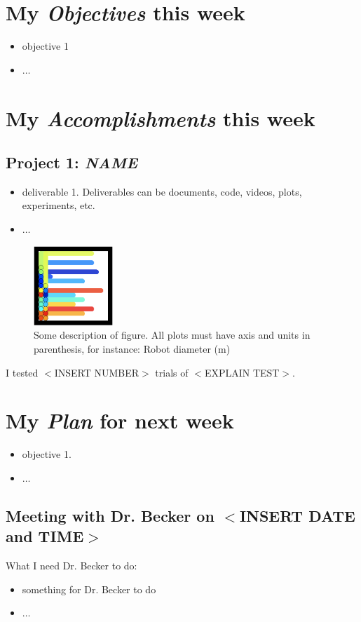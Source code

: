 \newcommand{\handoutName}{Weekly report}
\newcommand{\handoutdate}{\today}
\newcommand{\duedate}{}


\section{My \emph{Objectives} this week}
\begin{itemize}
\item objective 1
\item $\ldots$
\end{itemize}


\section{My \emph{Accomplishments} this week}

\subsection{Project 1: \emph{NAME}}

\begin{itemize}
\item deliverable 1.  Deliverables can be documents, code, videos, plots, experiments, etc.
\item $\ldots$
\end{itemize}

\begin{figure}[h]
\begin{center}
\includegraphics[width=3cm]{fig/CovergeSimpleEnd.png}
\caption{Some description of figure.  All plots must have axis and units in parenthesis, for instance:  Robot diameter (m)}
\end{center}
\end{figure}
I tested $<$INSERT NUMBER$>$ trials of $<$EXPLAIN TEST$>$.

\section{My \emph{Plan} for next week}

\begin{itemize}
\item objective 1. 
\item $\ldots$
\end{itemize}

\subsection{Meeting with Dr. Becker on $<$INSERT DATE and TIME$>$}

What I need Dr. Becker to do:
\begin{itemize}
\item something for Dr. Becker to do
\item $\ldots$
\end{itemize}


